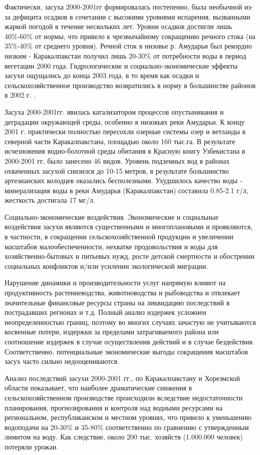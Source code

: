 Фактически, засуха 2000-2001гг формировалась постепенно, была необычной из-за дефицита осадков в сочетании с высокими уровнями испарения, вызванными жаркой погодой в течение нескольких лет. Уровни осадков достигли лишь 40\%-60\% от нормы, что привело к чрезвычайному сокращению речного стока (на 35\%-40\% от среднего уровня). Речной сток в низовье р. Амударьи был рекордно низким - Каракалпакстан получил лишь 20-30\% от потребности воды в период вегетации 2000 года. Гидрологические и социально-экономические эффекты засухи ощущались до конца 2003 года, в то время как осадки и сельскохозяйственное производство возвратились в норму в большинстве районов в 2002 г. \cite{Zasuha2013}.

Засуха 2000-2001гг. явилась катализатором процессов опустынивания и деградации окружающей среды, особенно в низовьях реки Амударьи. К концу 2001 г. практически полностью пересохли озерные системы озер и ветланды в северной части Каракалпакстана, площадью около 160 тыс.га. В результате исчезновения водно-болотной среды обитания в Красную книгу Узбекистана в 2000-2001 гг. было занесено 46 видов. Уровень подземных вод в районах охваченных засухой снизился до 10-15 метров, в результате большинство артезианских колодцев оказались бесполезными. Ухудшилось качество воды - минерализация воды в реки Амударья (Каракалпакстан) составила 0.85-2.1 г/л, жесткость достигала 17 мг/л.

Социально-экономические воздействия. Экономические и социальные воздействия засухи являются существенными и многоплановыми и проявляются, в частности, в сокращении сельскохозяйственной продукции и увеличении масштабов малообеспеченности, нехватке продовольствия и воды для хозяйственно-бытовых и питьевых нужд, росте детской смертности и обострении социальных конфликтов и/или усилении экологической миграции.

Нарушение динамики и производительности услуг напрямую влияют на продуктивность растениеводства, животноводства и рыбоводства и отвлекает значительные финансовые ресурсы страны на ликвидацию последствий в пострадавших регионах и т.д. Полный анализ издержек усложнен неопределенностью границ, поэтому во многих случаях зачастую не учитываются косвенные потери, издержки за пределами затрагиваемого района или соотношение издержек в случае осуществления действий и в случае бездействия. Соответственно, потенциальные экономические выгоды сокращения масштабов засух часто сильно недооцениваются.

Анализ последствий засухи 2000-2001 гг., по Каракалпакстану и Хорезмской области показывает, что наиболее драматические снижения в сельскохозяйственном производстве происходили вследствие недостаточности планирования, прогнозирования и контроля над водными ресурсами на региональном, республиканском и местном уровнях, что привело к уменьшению водоподачи на 20-30\% и 35-80\% соответственно по сравнению с утвержденным лимитом на воду. Как следствие, около 200 тыс. хозяйств (1.000.000 человек) потеряли урожаи.

